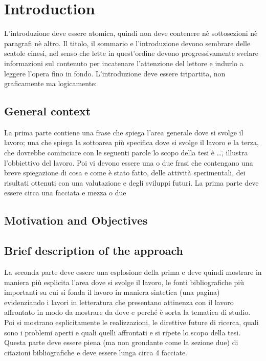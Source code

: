 \chapter{Introduction}
\label{Introduzione}
\thispagestyle{empty}



\noindent L'introduzione deve essere atomica, quindi non deve contenere n\`e sottosezioni n\`e 
paragrafi n\`e altro. Il titolo, il sommario e l'introduzione devono sembrare delle scatole cinesi, 
nel senso che lette in quest'ordine devono progressivamente svelare informazioni sul contenuto per 
incatenare l'attenzione del lettore e indurlo a leggere l'opera fino in fondo. L'introduzione deve 
essere tripartita, non graficamente ma logicamente:

\section{General context}
La prima parte contiene una frase che spiega l'area generale dove si svolge il lavoro; una che spiega 
la sottoarea pi\`u specifica dove si svolge il lavoro e la terza, che dovrebbe cominciare con le 
seguenti parole \" lo scopo della tesi \`e \dots\" , illustra l'obbiettivo del lavoro. Poi vi devono 
essere una o due frasi che contengano una breve spiegazione di cosa e come \`e stato fatto, delle 
attivit\`a sperimentali, dei risultati ottenuti con una valutazione e degli sviluppi futuri. La prima 
parte deve essere circa una facciata e mezza o due

\section{Motivation and Objectives}

\section{Brief description of the approach}
La seconda parte deve essere una esplosione della prima e deve quindi mostrare in maniera pi\`u esplicita l'area dove si svolge il lavoro, le fonti bibliografiche pi\`u importanti su cui si fonda il lavoro in maniera sintetica (una pagina) evidenziando i lavori in letteratura che presentano attinenza con il lavoro affrontato in modo da mostrare da dove e perch\'e \`e sorta la tematica di studio. Poi si mostrano esplicitamente le realizzazioni, le direttive future di ricerca, quali sono i problemi aperti e quali quelli affrontati e si ripete lo scopo della tesi. Questa parte deve essere piena (ma non grondante come la sezione due) di citazioni bibliografiche e deve essere lunga circa 4 facciate.



